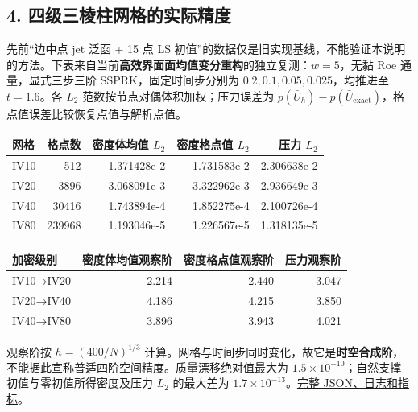 \documentclass[
]{ctexart}
\begin{document}
\hypertarget{ux56dbux7ea7ux4e09ux68f1ux67f1ux7f51ux683cux7684ux5b9eux9645ux7cbeux5ea6}{%
\subsection{4.
四级三棱柱网格的实际精度}\label{ux56dbux7ea7ux4e09ux68f1ux67f1ux7f51ux683cux7684ux5b9eux9645ux7cbeux5ea6}}

先前``边中点 jet 泛函 + 15 点 LS
初值''的数据仅是旧实现基线，不能验证本说明的方法。下表来自当前\textbf{高效界面面均值变分重构}的独立复测：\(w=5\)，无黏
Roe 通量，显式三步三阶 SSPRK，固定时间步分别为
\(0.2,0.1,0.05,0.025\)，均推进至 \(t=1.6\)。各 \(L_2\)
范数按节点对偶体积加权；压力误差为
\(p(\bar U_h)-p(\bar U_{\mathrm{exact}})\)，格点值误差比较恢复点值与解析点值。

\begin{longtable}[]{@{}lrrrr@{}}
\toprule\noalign{}
网格 & 格点数 & 密度体均值 \(L_2\) & 密度格点值 \(L_2\) & 压力
\(L_2\) \\
\midrule\noalign{}
\endhead
\bottomrule\noalign{}
\endlastfoot
IV10 & 512 & 1.371428e-2 & 1.731583e-2 & 2.306638e-2 \\
IV20 & 3896 & 3.068091e-3 & 3.322962e-3 & 2.936649e-3 \\
IV40 & 30416 & 1.743894e-4 & 1.852275e-4 & 2.100726e-4 \\
IV80 & 239968 & 1.193046e-5 & 1.226567e-5 & 1.318135e-5 \\
\end{longtable}

\begin{longtable}[]{@{}lrrr@{}}
\toprule\noalign{}
加密级别 & 密度体均值观察阶 & 密度格点值观察阶 & 压力观察阶 \\
\midrule\noalign{}
\endhead
\bottomrule\noalign{}
\endlastfoot
IV10→IV20 & 2.214 & 2.440 & 3.047 \\
IV20→IV40 & 4.186 & 4.215 & 3.850 \\
IV40→IV80 & 3.896 & 3.943 & 4.021 \\
\end{longtable}

观察阶按 \(h=(400/N)^{1/3}\)
计算。网格与时间步同时变化，故它是\textbf{时空合成阶}，不能据此宣称普适四阶空间精度。质量漂移绝对值最大为
\(1.5\times10^{-10}\)；自然支撑初值与零初值所得密度及压力 \(L_2\)
的最大差为
\(1.7\times10^{-13}\)。\href{../reports/ncfv_face_variational_w5p0_prism_ssprk3_t1p6_warm_20260923/summary.md}{完整
JSON、日志和指标}。
\end{document}
